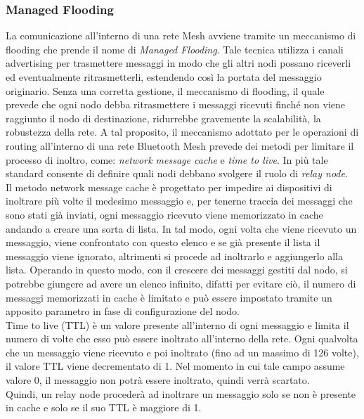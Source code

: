 \subsubsection{Managed Flooding}
\label{subsub:managed_flooding}
La comunicazione all'interno di una rete Mesh avviene tramite un meccanismo di flooding che prende il nome di \textit{Managed Flooding}. Tale tecnica utilizza i canali advertising per trasmettere messaggi in modo che gli altri nodi possano riceverli ed eventualmente ritrasmetterli, estendendo così la portata del messaggio originario. 
Senza una corretta gestione, il meccanismo di flooding, il quale prevede che ogni nodo debba ritrasmettere i messaggi ricevuti finché non viene raggiunto il nodo di destinazione, ridurrebbe gravemente la scalabilità, la robustezza della rete. %
A tal proposito, il meccanismo adottato per le operazioni di routing all'interno di una rete Bluetooth Mesh prevede dei metodi per limitare il processo di inoltro, come: \textit{network message cache} e \textit{time to live}. In più tale standard consente di definire quali nodi debbano svolgere il ruolo di \textit{relay node}.\\
Il metodo network message cache è progettato per impedire ai dispositivi di inoltrare più volte il medesimo messaggio e, per tenerne traccia dei messaggi che sono stati già inviati, ogni messaggio ricevuto viene memorizzato in cache andando a creare una sorta di lista. In tal modo, ogni volta che viene ricevuto un messaggio, viene confrontato con questo elenco e se già presente il lista il messaggio viene ignorato, altrimenti si procede ad inoltrarlo e aggiungerlo alla lista. Operando in questo modo, con il crescere dei messaggi gestiti dal nodo, si potrebbe giungere ad avere un elenco infinito, difatti per evitare ciò, il numero di messaggi memorizzati in cache è limitato e può essere impostato tramite un apposito parametro in fase di configurazione del nodo.\\
Time to live (TTL) è un valore presente all'interno di ogni messaggio e limita il numero di volte che esso può essere inoltrato all'interno della rete. Ogni qualvolta che un messaggio viene ricevuto e poi inoltrato (fino ad un massimo di 126 volte), il valore TTL viene decrementato di 1. Nel momento in cui tale campo assume valore 0, il messaggio non potrà essere inoltrato, quindi verrà scartato.\\
Quindi, un relay node procederà ad inoltrare un messaggio solo se non è presente in cache e solo se il suo TTL è maggiore di 1.

